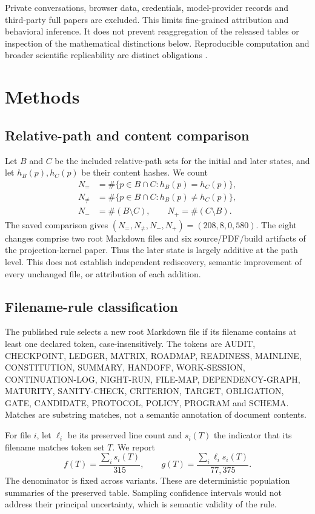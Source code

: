\documentclass[11pt,a4paper]{article}
\begin{document}
Private conversations, browser data, credentials, model-provider records and
third-party full papers are excluded. This limits fine-grained attribution
and behavioral inference. It does not prevent reaggregation of the released
tables or inspection of the mathematical distinctions below. Reproducible
computation and broader scientific replicability are distinct obligations
\cite{Peng2011,NASEM2019}.

\section{Methods}
\subsection{Relative-path and content comparison}
Let $B$ and $C$ be the included relative-path sets for the initial and later
states, and let $h_B(p),h_C(p)$ be their content hashes. We count
\begin{align}
N_{=}&=\#\{p\in B\cap C:h_B(p)=h_C(p)\},\\
N_{\ne}&=\#\{p\in B\cap C:h_B(p)\ne h_C(p)\},\\
N_{-}&=\#(B\setminus C),\qquad N_{+}=\#(C\setminus B).
\end{align}
The saved comparison gives $(N_=,N_{\ne},N_-,N_+)=(208,8,0,580)$.
The eight changes comprise two root Markdown files and six source/PDF/build
artifacts of the projection-kernel paper. Thus the later state is largely
additive at the path level. This does not establish independent rediscovery,
semantic improvement of every unchanged file, or attribution of each addition.

\subsection{Filename-rule classification}
The published rule selects a new root Markdown file if its filename contains
at least one declared token, case-insensitively. The tokens are AUDIT,
CHECKPOINT, LEDGER, MATRIX, ROADMAP, READINESS, MAINLINE, CONSTITUTION,
SUMMARY, HANDOFF, WORK-SESSION, CONTINUATION-LOG, NIGHT-RUN, FILE-MAP,
DEPENDENCY-GRAPH, MATURITY, SANITY-CHECK, CRITERION, TARGET, OBLIGATION,
GATE, CANDIDATE, PROTOCOL, POLICY, PROGRAM and SCHEMA. Matches are substring
matches, not a semantic annotation of document contents.

For file $i$, let $\ell_i$ be its preserved line count and $s_i(T)$ the
indicator that its filename matches token set $T$. We report
\begin{equation}
f(T)=\frac{\sum_i s_i(T)}{315},\qquad
g(T)=\frac{\sum_i\ell_i s_i(T)}{77,375}.
\label{eq:fractions}
\end{equation}
The denominator is fixed across variants. These are deterministic population
summaries of the preserved table. Sampling confidence intervals would not
address their principal uncertainty, which is semantic validity of the rule.
\end{document}
